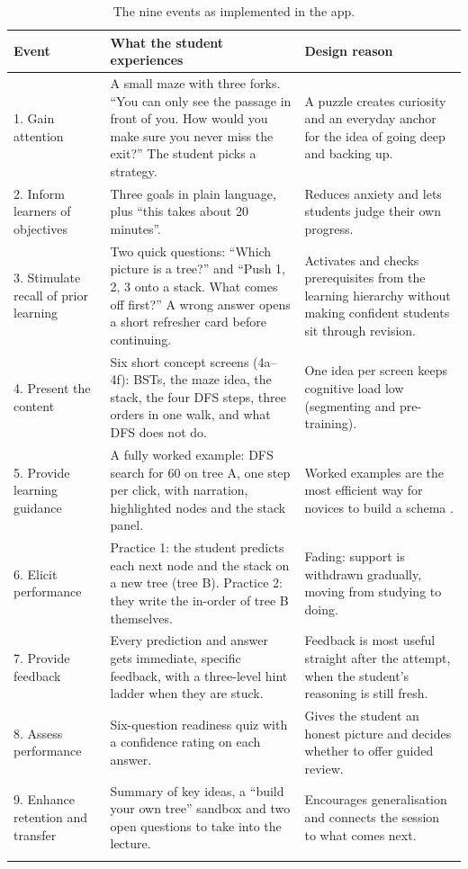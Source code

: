 \documentclass[11pt,a4paper]{article}
\begin{document}
\begin{longtable}{@{}p{2.6cm} p{6.6cm} p{5.6cm}@{}}
  \toprule
  \textbf{Event} & \textbf{What the student experiences} & \textbf{Design reason} \\
  \midrule
  \endhead
  1. Gain attention & A small maze with three forks. ``You can only see the passage in front of
     you. How would you make sure you never miss the exit?'' The student picks a strategy. &
     A puzzle creates curiosity and an everyday anchor for the idea of going deep and backing up. \\
  2. Inform learners of objectives & Three goals in plain language, plus ``this takes about
     20 minutes''. & Reduces anxiety and lets students judge their own progress. \\
  3. Stimulate recall of prior learning & Two quick questions: ``Which picture is a tree?'' and
     ``Push 1, 2, 3 onto a stack. What comes off first?'' A wrong answer opens a short refresher
     card before continuing. & Activates and checks prerequisites from the learning hierarchy
     without making confident students sit through revision. \\
  4. Present the content & Six short concept screens (4a--4f): BSTs, the maze idea, the stack,
     the four DFS steps, three orders in one walk, and what DFS does not do. & One idea per
     screen keeps cognitive load low (segmenting and pre-training). \\
  5. Provide learning guidance & A fully worked example: DFS search for 60 on tree A, one step
     per click, with narration, highlighted nodes and the stack panel. & Worked examples are the
     most efficient way for novices to build a schema \cite{atkinson2000}. \\
  6. Elicit performance & Practice 1: the student predicts each next node and the stack on a new
     tree (tree B). Practice 2: they write the in-order of tree B themselves. & Fading: support is
     withdrawn gradually, moving from studying to doing. \\
  7. Provide feedback & Every prediction and answer gets immediate, specific feedback, with a
     three-level hint ladder when they are stuck. & Feedback is most useful straight after the
     attempt, when the student's reasoning is still fresh. \\
  8. Assess performance & Six-question readiness quiz with a confidence rating on each answer. &
     Gives the student an honest picture and decides whether to offer guided review. \\
  9. Enhance retention and transfer & Summary of key ideas, a ``build your own tree'' sandbox and
     two open questions to take into the lecture. & Encourages generalisation and connects the
     session to what comes next. \\
  \bottomrule
  \caption{The nine events as implemented in the app.}
  \label{tab:gagne}
\end{longtable}
\end{document}
